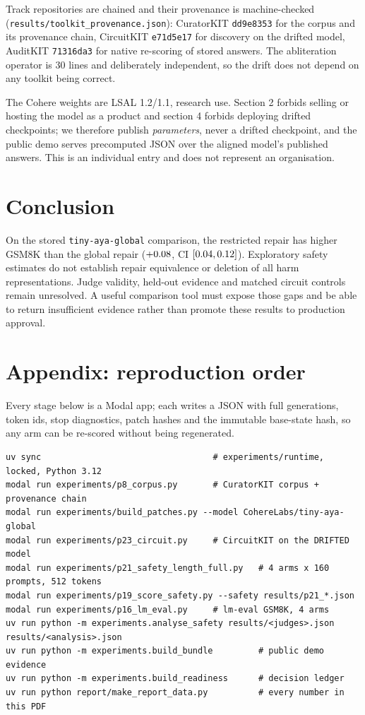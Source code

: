 \documentclass[10pt,a4paper]{article}
\newcommand{\code}[1]{\texttt{\small #1}}
\begin{document}
Track repositories are chained and their provenance is machine-checked
(\code{results/toolkit\_provenance.json}): CuratorKIT \code{dd9e8353} for the corpus and its
provenance chain, CircuitKIT \code{e71d5e17} for discovery on the drifted model, AuditKIT
\code{71316da3} for native re-scoring of stored answers. The abliteration operator is 30 lines and
deliberately independent, so the drift does not depend on any toolkit being correct.

The Cohere weights are LSAL 1.2/1.1, research use. Section 2 forbids selling or hosting the model as
a product and section 4 forbids deploying drifted checkpoints; we therefore publish
\emph{parameters}, never a drifted checkpoint, and the public demo serves precomputed JSON over the
aligned model's published answers. This is an individual entry and does not represent an
organisation.

\section{Conclusion}

On the stored \code{tiny-aya-global} comparison, the restricted repair has higher GSM8K than the
global repair ($+0.08$, CI $[0.04,0.12]$). Exploratory safety estimates do not establish
repair equivalence or deletion of all harm representations. Judge validity, held-out evidence and
matched circuit controls remain unresolved. A useful comparison tool must expose those gaps and be
able to return insufficient evidence rather than promote these results to production approval.

\section*{Appendix: reproduction order}

Every stage below is a Modal app; each writes a JSON with full generations, token ids, stop
diagnostics, patch hashes and the immutable base-state hash, so any arm can be re-scored without
being regenerated.

{\small
\begin{verbatim}
uv sync                                  # experiments/runtime, locked, Python 3.12
modal run experiments/p8_corpus.py       # CuratorKIT corpus + provenance chain
modal run experiments/build_patches.py --model CohereLabs/tiny-aya-global
modal run experiments/p23_circuit.py     # CircuitKIT on the DRIFTED model
modal run experiments/p21_safety_length_full.py   # 4 arms x 160 prompts, 512 tokens
modal run experiments/p19_score_safety.py --safety results/p21_*.json
modal run experiments/p16_lm_eval.py     # lm-eval GSM8K, 4 arms
uv run python -m experiments.analyse_safety results/<judges>.json results/<analysis>.json
uv run python -m experiments.build_bundle         # public demo evidence
uv run python -m experiments.build_readiness      # decision ledger
uv run python report/make_report_data.py          # every number in this PDF
\end{verbatim}
}
\end{document}
